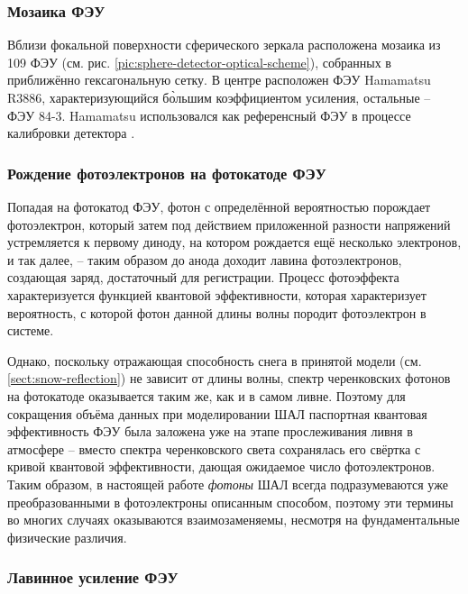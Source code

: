 \subsubsection{Мозаика ФЭУ}
\label{sec:pmt-mosaic-details}

Вблизи фокальной поверхности сферического зеркала расположена мозаика из 109 ФЭУ (см. рис. \ref{pic:sphere-detector-optical-scheme}), собранных в приближённо гексагональную сетку. В центре расположен ФЭУ Hamamatsu R3886, характеризующийся б\`{о}льшим коэффициентом усиления, остальные -- ФЭУ 84-3. Hamamatsu использовался как референсный ФЭУ в процессе калибровки детектора \cite{SphereCalibration2016}.

\subsubsection{Рождение фотоэлектронов на фотокатоде ФЭУ}

\label{sec:photon-to-phels-conversion}

Попадая на фотокатод ФЭУ, фотон с определённой вероятностью порождает фотоэлектрон, который затем под действием приложенной разности напряжений устремляется к первому диноду, на котором рождается ещё несколько электронов, и так далее, -- таким образом до анода доходит лавина фотоэлектронов, создающая заряд, достаточный для регистрации. Процесс фотоэффекта характеризуется функцией квантовой эффективности, которая характеризует вероятность, с которой фотон данной длины волны породит фотоэлектрон в системе.

Однако, поскольку отражающая способность снега в принятой модели (см. \ref{sect:snow-reflection}) не зависит от длины волны, спектр черенковских фотонов на фотокатоде оказывается таким же, как и в самом ливне. Поэтому для сокращения объёма данных при моделировании ШАЛ паспортная квантовая эффективность ФЭУ была заложена уже на этапе прослеживания ливня в атмосфере -- вместо спектра черенковского света сохранялась его свёртка с кривой квантовой эффективности, дающая ожидаемое число фотоэлектронов. Таким образом, в настоящей работе \textit{фотоны} ШАЛ всегда подразумеваются уже преобразованными в фотоэлектроны описанным способом, поэтому эти термины во многих случаях оказываются взаимозаменяемы, несмотря на фундаментальные физические различия.

\subsubsection{Лавинное усиление ФЭУ}
\label{sec:pmt-amplification-description}

